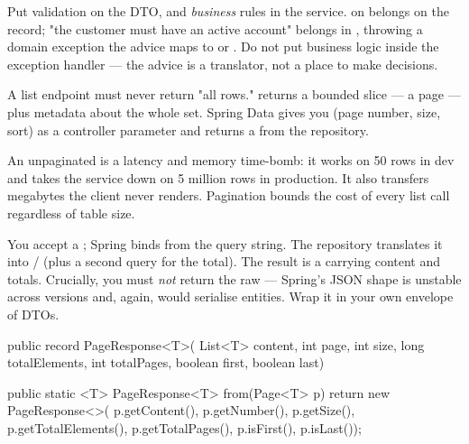 \begin{prodtip}
Put validation on the DTO, and \emph{business} rules in the service.  on  belongs on the record; "the customer must have an active account" belongs in , throwing a domain exception the advice maps to  or . Do not put business logic inside the exception handler --- the advice is a translator, not a place to make decisions.
\end{prodtip}


 A list endpoint must never return "all rows."  returns a bounded slice --- a page --- plus metadata about the whole set. Spring Data gives you  (page number, size, sort) as a controller parameter and returns a  from the repository.

 An unpaginated  is a latency and memory time-bomb: it works on 50 rows in dev and takes the service down on 5 million rows in production. It also transfers megabytes the client never renders. Pagination bounds the cost of every list call regardless of table size.

 You accept a ; Spring binds  from the query string. The repository translates it into / (plus a second  query for the total). The result is a  carrying content and totals. Crucially, you must \emph{not} return the raw  --- Spring's  JSON shape is unstable across versions and, again, would serialise entities. Wrap it in your own envelope of DTOs.

\begin{javabox}
public record PageResponse<T>(
    List<T> content, int page, int size,
    long totalElements, int totalPages,
    boolean first, boolean last) {

  public static <T> PageResponse<T> from(Page<T> p) {
    return new PageResponse<>(
        p.getContent(), p.getNumber(), p.getSize(),
        p.getTotalElements(), p.getTotalPages(),
        p.isFirst(), p.isLast());
  }
}
\end{javabox}

